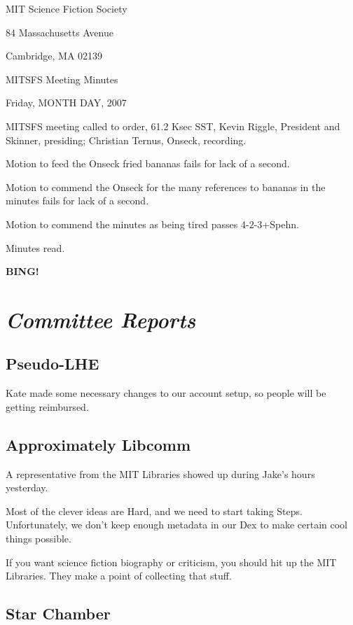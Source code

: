 \documentclass[10pt]{article}
\newcommand{\bing}{{\bf BING!} }
\newcommand{\goto}[1]{\bing \vskip 12pt \section*{{\em{#1}}}}
\begin{document}
\begin{center}

MIT Science Fiction Society

84 Massachusetts Avenue

Cambridge, MA 02139

\vspace{12pt}

MITSFS Meeting Minutes

Friday, MONTH DAY, 2007

\end{center}

\vspace{18pt}

\setlength{\parskip}{6pt}

\noindent
MITSFS meeting called to order, 61.2 Ksec SST,
Kevin Riggle, President and Skinner, presiding; Christian Ternus, Onseck, recording.

Motion to feed the Onseck fried bananas fails for lack of a second.

Motion to commend the Onseck for the many references to bananas in the minutes fails for lack of a second.

Motion to commend the minutes as being tired passes 4-2-3+Spehn.

Minutes read.

\BING

\goto{Committee Reports}

\subsection{Pseudo-LHE}

Kate made some necessary changes to our account setup, so people will be getting reimbursed.

\subsection{Approximately Libcomm}

A representative from the MIT Libraries showed up during Jake's hours yesterday.

Most of the clever ideas are Hard, and we need to start taking Steps.  Unfortunately, we don't keep enough metadata in our Dex to make certain cool things possible.

If you want science fiction biography or criticism, you should hit up the MIT Libraries.  They make a point of collecting that stuff.

\subsection{Star Chamber}
\end{document}
